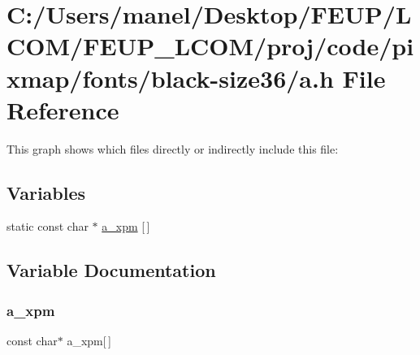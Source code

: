 \hypertarget{black-size36_2a_8h}{}\section{C\+:/\+Users/manel/\+Desktop/\+F\+E\+U\+P/\+L\+C\+O\+M/\+F\+E\+U\+P\+\_\+\+L\+C\+O\+M/proj/code/pixmap/fonts/black-\/size36/a.h File Reference}
\label{black-size36_2a_8h}
This graph shows which files directly or indirectly include this file\+:
\subsection*{Variables}
\begin{DoxyCompactItemize}
\item 
static const char $\ast$ \mbox{\hyperlink{black-size36_2a_8h_adb598fe0a2b04194fb29c1b1126f43e2}{a\+\_\+xpm}} \mbox{[}$\,$\mbox{]}
\end{DoxyCompactItemize}


\subsection{Variable Documentation}
\mbox{\label{black-size36_2a_8h_adb598fe0a2b04194fb29c1b1126f43e2}} 
\subsubsection{\texorpdfstring{a\_xpm}{a\_xpm}}
{\footnotesize\ttfamily const char$\ast$ a\+\_\+xpm\mbox{[}$\,$\mbox{]}\hspace{0.3cm}{\ttfamily [static]}}

